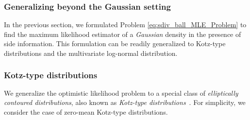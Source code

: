 \documentclass[sn-nature]{sn-jnl}%
\theoremstyle{thmstyleone}%
\theoremstyle{thmstyletwo}%
\theoremstyle{thmstylethree}%
\begin{document}

\subsubsection{Generalizing beyond the Gaussian setting}
In the previous section, we formulated Problem \eqref{eq:sdiv_ball_MLE_Problem} to find the maximum likelihood estimator of a \emph{Gaussian} density in the presence of side information. This formulation can be readily generalized to Kotz-type distributions \citep{Sra_conic_geometric_Opt_SPD, Fang2018} and the multivariate log-normal distribution.


\subsubsection{Kotz-type distributions}
We generalize the optimistic likelihood problem to a special class of \emph{elliptically contoured distributions}, also known as \emph{Kotz-type distributions}~\cite{Sra_conic_geometric_Opt_SPD,Fang2018}. For simplicity, we consider the case of zero-mean Kotz-type distributions.
\end{document}
